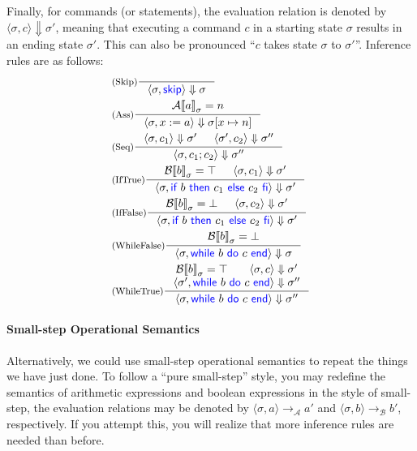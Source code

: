 \documentclass[11pt,a4paper]{article}
\newcommand{\pair}[1]{\langle #1 \rangle}
\newcommand{\evalA}[2]{{\mathcal{A}\llbracket #1 \rrbracket}_{#2}}
\newcommand{\evalB}[2]{{\mathcal{B}\llbracket #1 \rrbracket}_{#2}}
\newcommand{\evalC}[3]{\pair{#1, #2} \Downarrow #3}
\newcommand{\evalAS}[3]{\pair{#1, #2} \rightarrow_{\mathcal{A}} #3}
\newcommand{\evalBS}[3]{\pair{#1, #2} \rightarrow_{\mathcal{B}} #3}
\newcommand{\kword}[1]{{\color{blue} \textsf{#1}}}
\newcommand{\Skip}{\kword{skip}}
\newcommand{\If}{\kword{if}}
\newcommand{\Then}{\kword{then}}
\newcommand{\Else}{\kword{else}}
\newcommand{\Fi}{\kword{fi}}
\newcommand{\While}{\kword{while}}
\newcommand{\Do}{\kword{do}}
\newcommand{\End}{\kword{end}}
\begin{document}
Finally, for commands (or statements), the evaluation relation is denoted by $\evalC{\sigma}{c}{\sigma'}$, meaning that executing a command $c$ in a starting state $\sigma$ results in an ending state $\sigma'$.
This can also be pronounced ``$c$ takes state $\sigma$ to $\sigma'$''.
Inference rules are as follows:
\begin{align*}
	&\inference[(Skip)]{}{\evalC{\sigma}{\Skip}{\sigma}} \\
	&\inference[(Ass)]{\evalA{a}{\sigma}=n}{\evalC{\sigma}{x:=a}{\sigma[x\mapsto n]}} \\
	&\inference[(Seq)]{\evalC{\sigma}{c_1}{\sigma'} & \evalC{\sigma'}{c_2}{\sigma''}}
		{\evalC{\sigma}{c_1;c_2}{\sigma''}} \\
	&\inference[(IfTrue)]{\evalB{b}{\sigma}=\top & \evalC{\sigma}{c_1}{\sigma'}}
		{\evalC{\sigma}{\If~b~\Then~c_1~\Else~c_2~\Fi}{\sigma'}} \\
	&\inference[(IfFalse)]{\evalB{b}{\sigma}=\bot & \evalC{\sigma}{c_2}{\sigma'}}
		{\evalC{\sigma}{\If~b~\Then~c_1~\Else~c_2~\Fi}{\sigma'}} \\
	&\inference[(WhileFalse)]{\evalB{b}{\sigma}=\bot}
		{\evalC{\sigma}{\While~b~\Do~c~\End}{\sigma}} \\
	&\inference[(WhileTrue)]{\evalB{b}{\sigma}=\top & \evalC{\sigma}{c}{\sigma'} \\
		\evalC{\sigma'}{\While~b~\Do~c~\End}{\sigma''}}{\evalC{\sigma}{\While~b~\Do~c~\End}{\sigma''}}
\end{align*}

\paragraph{Small-step Operational Semantics}

Alternatively, we could use small-step operational semantics to repeat the things we have just done.
To follow a ``pure small-step'' style, you may redefine the semantics of arithmetic expressions and boolean expressions in the style of small-step, the evaluation relations may be denoted by $\evalAS{\sigma}{a}{a'}$ and $\evalBS{\sigma}{b}{b'}$, respectively.
If you attempt this, you will realize that more inference rules are needed than before.
\end{document}

